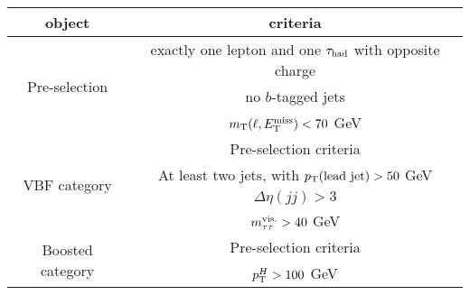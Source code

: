 \begin{tabular}{c|c}
  object   & criteria \\
  \hline\hline
  \multirow{3}{*}{Pre-selection}    & exactly one lepton and one $\tau_\text{had}$ with opposite charge \\
                                    & no $b$-tagged jets \\
                                    & $m_\text{T}(\ell, E_{\mathrm{T}}^{\mathrm{miss}}) < 70$ GeV \\
  \hline
  \multirow{4}{*}{VBF category}     & Pre-selection criteria \\
                                    & At least two jets, with $p_{\mathrm{T}}(\text{lead jet}) > 50$ GeV \\
                                    & $\Delta\eta(jj) > 3$ \\
                                    & $m_{\tau\tau}^\text{vis.} > 40$ GeV \\
  \hline
  \multirow{2}{*}{Boosted category} & Pre-selection criteria \\
                                    & $p_{\mathrm{T}}^H > 100$ GeV \\
\end{tabular}
